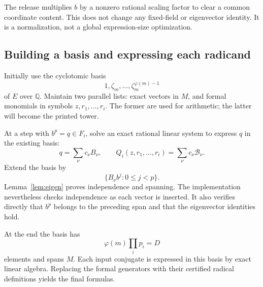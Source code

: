 \documentclass[11pt,a4paper]{article}
\newcommand{\Q}{\mathbb Q}
\theoremstyle{definition}
\theoremstyle{remark}
\begin{document}
The release multiplies $b$ by a nonzero rational scaling factor to clear a common coordinate content. This does not change any fixed-field or eigenvector identity. It is a normalization, not a global expression-size optimization.

\subsection{Building a basis and expressing each radicand}

Initially use the cyclotomic basis
\[
 1,\zeta_m,\ldots,\zeta_m^{\varphi(m)-1}
\]
of $E$ over $\Q$. Maintain two parallel lists: exact vectors in $M$, and formal monomials in symbols $z,r_1,\ldots,r_i$. The former are used for arithmetic; the latter will become the printed tower.

At a step with $b^p=q\in F_i$, solve an exact rational linear system to express $q$ in the existing basis:
\begin{equation}
 q=\sum_\nu c_\nu B_\nu,
 \qquad Q_i(z,r_1,\ldots,r_i)=\sum_\nu c_\nu\mathcal B_\nu.
 \label{eq:radicandcoords}
\end{equation}
Extend the basis by
\begin{equation}
 \{B_\nu b^j:0\le j<p\}.
 \label{eq:basisextension}
\end{equation}
Lemma~\ref{lem:eigen} proves independence and spanning. The implementation nevertheless checks independence as each vector is inserted. It also verifies directly that $b^p$ belongs to the preceding span and that the eigenvector identities hold.

At the end the basis has
\[
 \varphi(m)\prod_i p_i=D
\]
elements and spans $M$. Each input conjugate is expressed in this basis by exact linear algebra. Replacing the formal generators with their certified radical definitions yields the final formulas.
\end{document}
